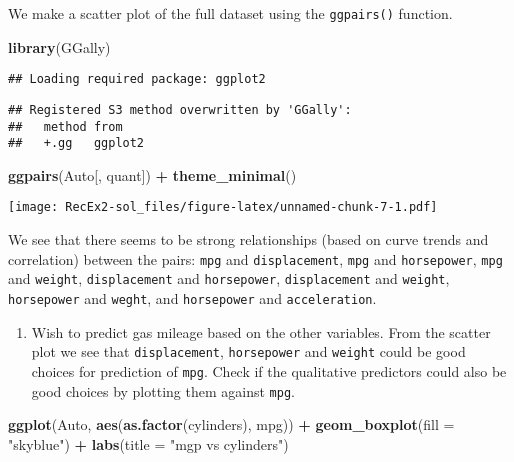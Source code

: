 \documentclass[
]{article}
\newenvironment{Shaded}{\begin{snugshade}}{\end{snugshade}}
\newcommand{\AttributeTok}[1]{\textcolor[rgb]{0.13,0.29,0.53}{#1}}
\newcommand{\FunctionTok}[1]{\textcolor[rgb]{0.13,0.29,0.53}{\textbf{#1}}}
\newcommand{\NormalTok}[1]{#1}
\newcommand{\SpecialCharTok}[1]{\textcolor[rgb]{0.81,0.36,0.00}{\textbf{#1}}}
\newcommand{\StringTok}[1]{\textcolor[rgb]{0.31,0.60,0.02}{#1}}
\providecommand{\tightlist}{%
  \setlength{\itemsep}{0pt}\setlength{\parskip}{0pt}}
\begin{document}
We make a scatter plot of the full dataset using the \texttt{ggpairs()}
function.

\begin{Shaded}
\begin{Highlighting}[]
\FunctionTok{library}\NormalTok{(GGally)}
\end{Highlighting}
\end{Shaded}

\begin{verbatim}
## Loading required package: ggplot2
\end{verbatim}

\begin{verbatim}
## Registered S3 method overwritten by 'GGally':
##   method from   
##   +.gg   ggplot2
\end{verbatim}

\begin{Shaded}
\begin{Highlighting}[]
\FunctionTok{ggpairs}\NormalTok{(Auto[, quant]) }\SpecialCharTok{+} \FunctionTok{theme\_minimal}\NormalTok{()}
\end{Highlighting}
\end{Shaded}

\texttt{[image: RecEx2-sol\_files/figure-latex/unnamed-chunk-7-1.pdf]}

We see that there seems to be strong relationships (based on curve
trends and correlation) between the pairs: \texttt{mpg} and
\texttt{displacement}, \texttt{mpg} and \texttt{horsepower},
\texttt{mpg} and \texttt{weight}, \texttt{displacement} and
\texttt{horsepower}, \texttt{displacement} and \texttt{weight},
\texttt{horsepower} and \texttt{weght}, and \texttt{horsepower} and
\texttt{acceleration}.

\begin{enumerate}
\def\labelenumi{\alph{enumi})}
\setcounter{enumi}{5}
\tightlist
\item
  Wish to predict gas mileage based on the other variables. From the
  scatter plot we see that \texttt{displacement}, \texttt{horsepower}
  and \texttt{weight} could be good choices for prediction of
  \texttt{mpg}. Check if the qualitative predictors could also be good
  choices by plotting them against \texttt{mpg}.
\end{enumerate}

\begin{Shaded}
\begin{Highlighting}[]
\FunctionTok{ggplot}\NormalTok{(Auto, }\FunctionTok{aes}\NormalTok{(}\FunctionTok{as.factor}\NormalTok{(cylinders), mpg)) }\SpecialCharTok{+} 
  \FunctionTok{geom\_boxplot}\NormalTok{(}\AttributeTok{fill =} \StringTok{"skyblue"}\NormalTok{) }\SpecialCharTok{+} 
  \FunctionTok{labs}\NormalTok{(}\AttributeTok{title =} \StringTok{"mgp vs cylinders"}\NormalTok{) }
\end{Highlighting}
\end{Shaded}
\end{document}

